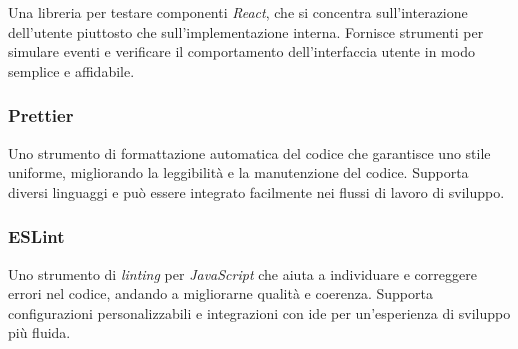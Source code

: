 Una libreria per testare componenti \textit{React}, che si concentra sull'interazione dell'utente piuttosto che sull'implementazione interna. 
Fornisce strumenti per simulare eventi e verificare il comportamento dell'interfaccia utente in modo semplice e affidabile.

\subsubsection{Prettier}

Uno strumento di formattazione automatica del codice che garantisce uno stile uniforme, migliorando la leggibilità e la manutenzione del codice. 
Supporta diversi linguaggi e può essere integrato facilmente nei flussi di lavoro di sviluppo.

\subsubsection{ESLint}

Uno strumento di \textit{linting} per \textit{JavaScript} che aiuta a individuare e correggere errori nel codice, andando a migliorarne qualità e coerenza.
Supporta configurazioni personalizzabili e integrazioni con \gls{ide} per un'esperienza di sviluppo più fluida.


